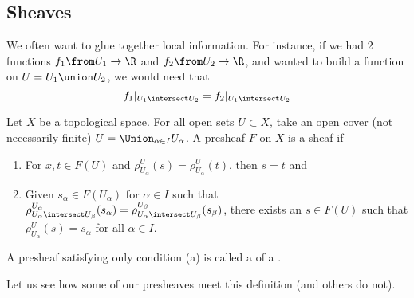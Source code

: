 \documentclass[11pt,leqno,oneside]{amsbook}
\renewcommand{\F}{F}
\numberwithin{thm}{section}
\begin{document}
\subsection{Sheaves}
We often want to glue together local information. For instance, if we
had 2 functions \(f_1 \from U_1 \to \R\) and \(f_2 \from U_2 \to \R\),
and wanted to build a function on \(U = U_1 \union U_2\), we would
need that \[
  f_1|_{U_1 \intersect U_2} = f_2|_{U_1 \intersect U_2}
\]
\begin{defn}
  Let \(X\) be a topological space. For all open sets \(U \subset X\),
  take an open cover (not necessarily finite)  \(U = \Union_{\alpha
    \in I} U_\alpha\). A presheaf \(\F\) on \(X\) is a sheaf if
  \begin{enumerate}
  \item For \(x,t \in \F(U)\) and \(\rho^U_{U_\alpha}(s) =
    \rho^U_{U_\alpha}(t)\), then \(s=t\) and
  \item Given \(s_\alpha \in \F(U_\alpha)\) for \(\alpha \in I\) such that
    \(\rho^{U_\alpha}_{U_\alpha \intersect U_\beta}(s_\alpha) =
    \rho^{U_\beta}_{U_\alpha \intersect U_\beta}(s_\beta) \), there
    exists an \(s \in \F(U)\) such that \(\rho^U_{U_\alpha}(s) =
    s_\alpha \) for all \(\alpha \in I\).
  \end{enumerate}
\end{defn}
\begin{rmk}
  A presheaf satisfying only condition (a) is called a  of a .
\end{rmk}
Let us see how some of our presheaves meet this definition (and others
do not).
\end{document}
